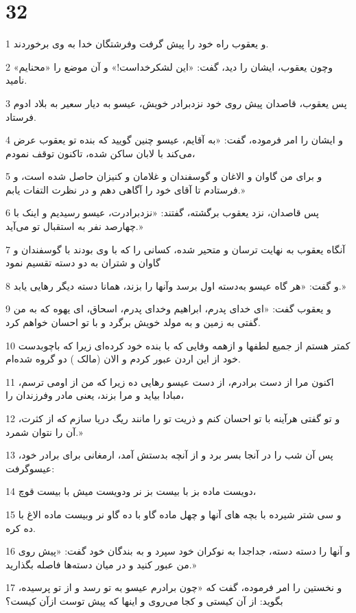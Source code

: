 \chapter{32}

\par 1 و یعقوب راه خود را پیش گرفت وفرشتگان خدا به وی برخوردند.
\par 2 وچون یعقوب، ایشان را دید، گفت: «این لشکرخداست!» و آن موضع را «محنایم» نامید.
\par 3 پس یعقوب، قاصدان پیش روی خود نزدبرادر خویش، عیسو به دیار سعیر به بلاد ادوم فرستاد.
\par 4 و ایشان را امر فرموده، گفت: «به آقایم، عیسو چنین گویید که بنده تو یعقوب عرض می‌کند با لابان ساکن شده، تاکنون توقف نمودم،
\par 5 و برای من گاوان و الاغان و گوسفندان و غلامان و کنیزان حاصل شده است، و فرستادم تا آقای خود را آگاهی دهم و در نظرت التفات یابم.»
\par 6 پس قاصدان، نزد یعقوب برگشته، گفتند: «نزدبرادرت، عیسو رسیدیم و اینک با چهارصد نفر به استقبال تو می‌آید.»
\par 7 آنگاه یعقوب به نهایت ترسان و متحیر شده، کسانی را که با وی بودند با گوسفندان و گاوان و شتران به دو دسته تقسیم نمود 
\par 8 و گفت: «هر گاه عیسو به‌دسته اول برسد وآنها را بزند، همانا دسته دیگر رهایی یابد.»
\par 9 و یعقوب گفت: «ای خدای پدرم، ابراهیم وخدای پدرم، اسحاق، ای یهوه که به من گفتی به زمین و به مولد خویش برگرد و با تو احسان خواهم کرد.
\par 10 کمتر هستم از جمیع لطفها و ازهمه وفایی که با بنده خود کرده‌ای زیرا که باچوبدست خود از این اردن عبور کردم و الان (مالک ) دو گروه شده‌ام.
\par 11 اکنون مرا از دست برادرم، از دست عیسو رهایی ده زیرا که من از اومی ترسم، مبادا بیاید و مرا بزند، یعنی مادر وفرزندان را،
\par 12 و تو گفتی هرآینه با تو احسان کنم و ذریت تو را مانند ریگ دریا سازم که از کثرت، آن را نتوان شمرد.»
\par 13 پس آن شب را در آنجا بسر برد و از آنچه بدستش آمد، ارمغانی برای برادر خود، عیسوگرفت:
\par 14 دویست ماده بز با بیست بز نر ودویست میش با بیست قوچ،
\par 15 و سی شتر شیرده با بچه های آنها و چهل ماده گاو با ده گاو نر وبیست ماده الاغ با ده کره.
\par 16 و آنها را دسته دسته، جداجدا به نوکران خود سپرد و به بندگان خود گفت: «پیش روی من عبور کنید و در میان دسته‌ها فاصله بگذارید.»
\par 17 و نخستین را امر فرموده، گفت که «چون برادرم عیسو به تو رسد و از تو پرسیده، بگوید: از آن کیستی و کجا می‌روی و اینها که پیش توست ازآن کیست؟
